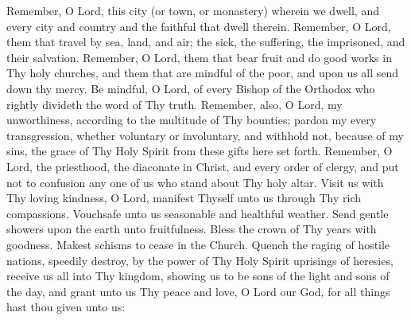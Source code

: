 \begin{semisecret}
    \begin{secretprayerbasil}
        \tiny Remember, O Lord, this city (or town, or monastery) wherein we dwell, and every city and country and the faithful that dwell therein. Remember, O Lord, them that travel by sea, land, and air; the sick, the suffering, the imprisoned, and their salvation. Remember, O Lord, them that bear fruit and do good works in Thy holy churches, and them that are mindful of the poor, and upon us all send down thy mercy.
        \switchcolumn
        \tiny Be mindful, O Lord, of every Bishop of the Orthodox who rightly divideth the word of Thy truth. Remember, also, O Lord, my unworthiness, according to the multitude of Thy bounties; pardon my every transgression, whether voluntary or involuntary, and withhold not, because of my sins, the grace of Thy Holy Spirit from these gifts here set forth. Remember, O Lord, the priesthood, the diaconate in Christ, and every order of clergy, and put not to confusion any one of us who stand about Thy holy altar. Visit us with Thy loving kindness, O Lord, manifest Thyself unto us through Thy rich compassions. Vouchsafe unto us seasonable and healthful weather. Send gentle showers upon the earth unto fruitfulness. Bless the crown of Thy years with goodness. Makest schisms to cease in the Church. Quench the raging of hostile nations, speedily destroy, by the power of Thy Holy Spirit uprisings of heresies, receive us all into Thy kingdom, showing us to be sons of the light and sons of the day, and grant unto us Thy peace and love, O Lord our God, for all things hast thou given unto us: 
    \end{secretprayerbasil}
\end{semisecret}
\pagebreak
